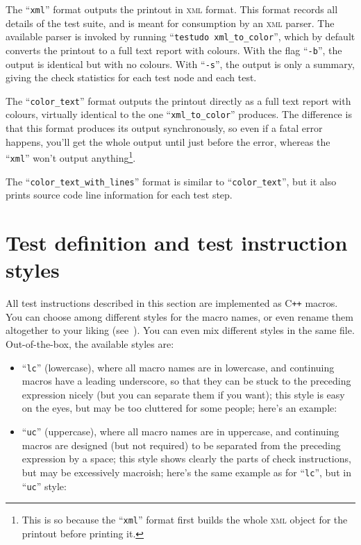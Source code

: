 \documentclass[twoside, a4paper, article]{memoir}
\newcommand*\Cpp{C\texttt{++}}
\begin{document}
The ``\texttt{xml}'' format outputs the printout in \textsc{xml} format.  This
format records all details of the test suite, and is meant for consumption by
an \textsc{xml} parser.  The available parser is invoked by running
``\texttt{testudo xml\_to\_color}'', which by default converts the printout to
a full text report with colours.  With the flag ``\texttt{-b}'', the output is
identical but with no colours.  With ``\texttt{-s}'', the output is only a
summary, giving the check statistics for each test node and each test.

The ``\texttt{color\_text}'' format outputs the printout directly as a full
text report with colours, virtually identical to the one
``\texttt{xml\_to\_color}'' produces.  The difference is that this format
produces its output synchronously, so even if a fatal error happens, you'll get
the whole output until just before the error, whereas the ``\texttt{xml}''
won't output anything\footnote{This is so because the ``\texttt{xml}'' format
  first builds the whole \textsc{xml} object for the printout before printing
  it.}.

The ``\texttt{color\_text\_with\_lines}'' format is similar to
``\texttt{color\_text}'', but it also prints source code line information for
each test step.


\chapter{Test definition and test instruction styles}
\label{cha:test-definition-test-instruction-styles}

All test instructions described in this section are implemented as \Cpp{}
macros.  You can choose among different styles for the macro names, or even
rename them altogether to your liking
(see~).  You can even mix different
styles in the same file.  Out-of-the-box, the available styles are:
\begin{itemize}
\item ``\texttt{lc}'' (lowercase), where all macro names are in lowercase, and
  continuing macros have a leading underscore, so that they can be stuck to the
  preceding expression nicely (but you can separate them if you want); this
  style is easy on the eyes, but may be too cluttered for some people; here's
  an example:
  

\item ``\texttt{uc}'' (uppercase), where all macro names are in uppercase, and
  continuing macros are designed (but not required) to be separated from the
  preceding expression by a space; this style shows clearly the parts of check
  instructions, but may be excessively macroish; here's the same example as for
  ``\texttt{lc}'', but in ``\texttt{uc}'' style:
  
\end{itemize}
\end{document}
